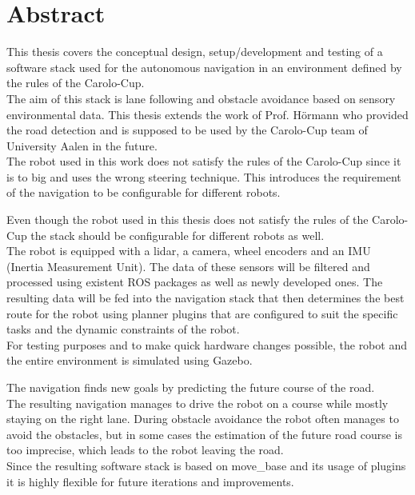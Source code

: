 \chapter*{Abstract}
\label{abstract}
This thesis covers the conceptual design, setup/development and testing of a software stack used for the autonomous navigation in an environment defined by the rules of the Carolo-Cup.\\

 The aim of this stack is lane following and obstacle avoidance based on sensory environmental data. This thesis extends the work of Prof. Hörmann who provided the road detection and is supposed to be used by the Carolo-Cup team of University Aalen in the future.\\
 The robot used in this work does not satisfy the rules of the Carolo-Cup since it is to big and uses the wrong steering technique. This introduces the requirement of the navigation to be configurable for different robots.
 
 Even though the robot used in this thesis does not satisfy the rules of the Carolo-Cup the stack should be configurable for different robots as well.\\
The robot is equipped with a lidar, a camera, wheel encoders and an IMU (Inertia Measurement Unit). The data of these sensors will be filtered and processed using existent ROS packages as well as newly developed ones. The resulting data will be fed into the navigation stack that then determines the best route for the robot using planner plugins that are configured to suit the specific tasks and the dynamic constraints of the robot.\\

For testing purposes and to make quick hardware changes possible, the robot and the entire environment is simulated using Gazebo.\\

The navigation finds new goals by predicting the future course of the road.\\

The resulting navigation manages to drive the robot on a course while mostly staying on the right lane. During obstacle avoidance the robot often manages to avoid the obstacles, but in some cases the estimation of the future road course is too imprecise, which leads to the robot leaving the road.\\

Since the resulting software stack is based on move\_base and its usage of plugins it is highly flexible for future iterations and improvements.\\